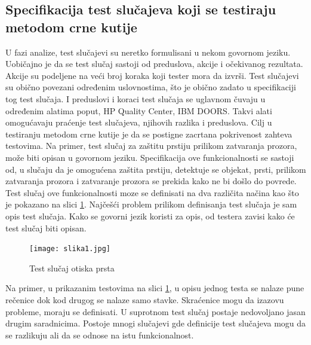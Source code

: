 \documentclass[a4paper]{article}
\begin{document}
\subsection{Specifikacija test slučajeva koji se testiraju metodom crne kutije}
\label{subsec:spectestslucaj}


U fazi analize, test slučajevi su neretko formulisani u nekom govornom jeziku. Uobičajno je da se test slučaj sastoji od preduslova, akcije i očekivanog rezultata. Akcije su podeljene na veći broj koraka koji tester mora da izvrši. Test slučajevi su obično povezani određenim uslovnostima, što je obično zadato u specifikaciji tog test slučaja. I preduslovi i koraci test slučaja se uglavnom čuvaju u određenim alatima poput, HP Quality Center, IBM DOORS. Takvi alati omogućavaju praćenje test slučajeva, njihovih razlika i preduslova. Cilj u testiranju metodom crne kutije je da se postigne zacrtana pokrivenost zahteva testovima. Na primer, test slučaj za zaštitu prstiju prilikom zatvaranja prozora, može biti opisan u govornom jeziku. Specifikacija ove funkcionalnosti se sastoji od, u slučaju da je omogućena zaštita prstiju, detektuje se objekat, prsti, prilikom zatvaranja prozora i zatvaranje prozora se prekida kako ne bi došlo do povrede. Test slučaj ove funkcionalnosti moze se definisati na dva različita načina kao što je pokazano na slici \ref{fig:slika1}. Najčešći problem prilikom definisanja test slučaja je sam opis test slučaja. Kako se govorni jezik koristi za opis, od testera zavisi kako će test slučaj biti opisan.

\bigbreak
\begin{figure}[h!]
\begin{center}
\texttt{[image: slika1.jpg]}
\end{center}
\caption{Test slučaj otiska prsta}
\label{fig:slika1}
\end{figure}
\bigbreak

Na primer, u prikazanim testovima na slici \ref{fig:slika1}, u opisu jednog testa se nalaze pune rečenice dok kod drugog se nalaze samo stavke. Skraćenice mogu da izazovu probleme, moraju se definisati. U suprotnom test slučaj postaje nedovoljano jasan drugim saradnicima. Postoje mnogi slučajevi gde definicije test slučajeva mogu da se razlikuju ali da se odnose na istu funkcionalnost.
\bigbreak
\end{document}
